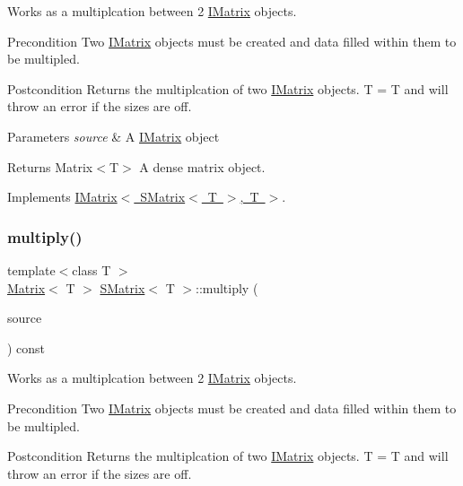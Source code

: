 Works as a multiplcation between 2 \mbox{\hyperlink{class_i_matrix}{I\+Matrix}} objects. 

\begin{DoxyPrecond}{Precondition}
Two \mbox{\hyperlink{class_i_matrix}{I\+Matrix}} objects must be created and data filled within them to be multipled. 
\end{DoxyPrecond}
\begin{DoxyPostcond}{Postcondition}
Returns the multiplcation of two \mbox{\hyperlink{class_i_matrix}{I\+Matrix}} objects. T = T and will throw an error if the sizes are off.
\end{DoxyPostcond}

\begin{DoxyParams}{Parameters}
{\em source} & A \mbox{\hyperlink{class_i_matrix}{I\+Matrix}} object \\
\hline
\end{DoxyParams}
\begin{DoxyReturn}{Returns}
Matrix$<$\+T$>$ A dense matrix object. 
\end{DoxyReturn}


Implements \mbox{\hyperlink{class_i_matrix_aa4d4f7ce2daec7d68ff8fd590652544d}{I\+Matrix$<$ S\+Matrix$<$ T $>$, T $>$}}.

\mbox{\label{class_s_matrix_a6c545e29bc68b553583d01f25c62e702}} 
\subsubsection{\texorpdfstring{multiply()}{multiply()}\hspace{0.1cm}{\footnotesize\ttfamily [6/6]}}
{\footnotesize\ttfamily template$<$class T $>$ \\
\mbox{\hyperlink{class_matrix}{Matrix}}$<$ T $>$ \mbox{\hyperlink{class_s_matrix}{S\+Matrix}}$<$ T $>$\+::multiply (\begin{DoxyParamCaption}\item[{const \mbox{\hyperlink{class_i_matrix}{I\+Matrix}}$<$ \mbox{\hyperlink{class_d_matrix}{D\+Matrix}}$<$ T $>$, T $>$ \&}]{source }\end{DoxyParamCaption}) const}



Works as a multiplcation between 2 \mbox{\hyperlink{class_i_matrix}{I\+Matrix}} objects. 

\begin{DoxyPrecond}{Precondition}
Two \mbox{\hyperlink{class_i_matrix}{I\+Matrix}} objects must be created and data filled within them to be multipled. 
\end{DoxyPrecond}
\begin{DoxyPostcond}{Postcondition}
Returns the multiplcation of two \mbox{\hyperlink{class_i_matrix}{I\+Matrix}} objects. T = T and will throw an error if the sizes are off.
\end{DoxyPostcond}

